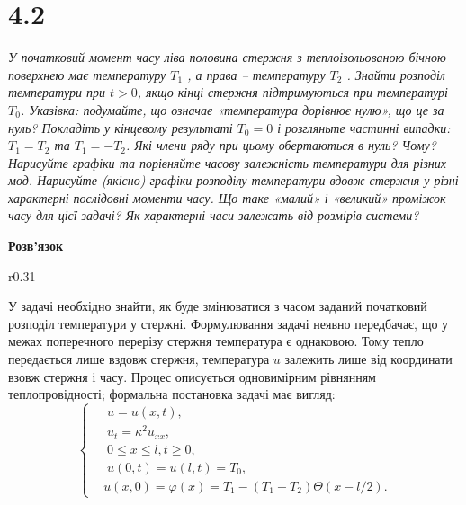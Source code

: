 

%


\section[Задача №4.2]{4.2}

\textit{У початковий момент часу ліва половина стержня з теплоізольованою бічною поверхнею має температуру $T_1$ , а права -- температуру $T_2$ . Знайти розподіл температури при $t> 0$, якщо кінці стержня підтримуються при температурі $T_0$. Указівка: подумайте, що означає «температура дорівнює нулю», що це за нуль? Покладіть у кінцевому результаті $T_0 = 0$ і розгляньте частинні випадки: $T_1 = T_2$ та $T_1 = -T_2$. Які члени ряду при цьому обертаються в нуль? Чому? Нарисуйте графіки та порівняйте часову залежність температури для     різних мод. Нарисуйте (якісно) графіки розподілу     температури вдовж стержня у різні характерні послідовні моменти часу. Що таке «малий» і «великий» проміжок часу для цієї задачі? Як характерні часи залежать від розмірів системи?}

\begin{center}
    \textbf{Розв'язок}
\end{center}

\begin{wrapfigure}{r}{0.31\textwidth}
    \centering
\end{wrapfigure}

У задачі необхідно знайти, як буде змінюватися з часом заданий початковий розподіл температури у стержні. Формулювання задачі неявно передбачає, що у межах поперечного перерізу стержня температура є однаковою. Тому тепло передається лише вздовж стержня, температура $u$ залежить лише від координати взовж стержня і часу. Процес описується одновимірним рівнянням теплопровідності; формальна постановка задачі має вигляд:
\begin{equation} \label{cond4,2}
    \left\{ \begin{aligned}
        &\;u = u(x,t), \\
        &\;u_{t} = \kappa^2 u_{xx}, \\
        &\;0 \leq x \leq l, t \geq 0, \\
        &\;u(0,t) = u(l,t) = T_0,\\
        &u(x,0) = \varphi(x) = T_1 - (T_1 - T_2)\Theta(x - l/2).
    \end{aligned} \right.
\end{equation}
\vspace{1cm}


